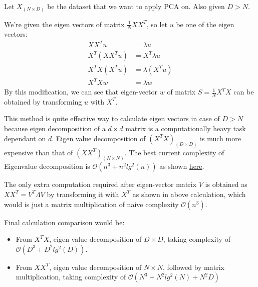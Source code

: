 \documentclass[a4paper,11pt]{article}
\begin{document}
\begin{mlsolution}

Let $X_{(N\times D)}$ be the dataset that we want to apply PCA on. Also given $D > N$.

We're given the eigen vectors of matrix $\frac{1}{N}XX^T$, so let $u$ be one of the eigen vectors:
\begin{align*}
    XX^T u &= \lambda u \\
    X^T (XX^T u) &= X^T \lambda u \\
    X^TX (X^T u) &= \lambda (X^T u) \\
    X^TX w &= \lambda w
\end{align*}
By this modification, we can see that eigen-vector $w$ of matrix $S = \frac{1}{N}X^TX$ can be obtained by transforming $u$ with $X^T$.

This method is quite effective way to calculate eigen vectors in case of $D > N$ because eigen decomposition of a $d \times d$ matrix is a computationally heavy task dependant on $d$.
Eigen value decomposition of $(X^TX)_{(D\times D)}$ is much more expensive than that of $(XX^T)_{(N\times N)}$. The best current complexity of Eigenvalue decomposition is $\mathcal{O}(n^3 + n^2 lg^2(n))$ as shown \href{https://cstheory.stackexchange.com/a/2810}{here}.

The only extra computation required after eigen-vector matrix $V$ is obtained as $XX^T = V^T \Lambda V$ by transforming it with $X^T$ as shown in above calculation, which would is just a matrix multiplication of naive complexity $\mathcal{O}(n^3)$.

Final calculation comparison would be:
\begin{itemize}[itemsep=2pt]
    \item From $X^TX$, eigen value decomposition of $D\times D$, taking complexity of $\mathcal{O}(D^3 + D^2 lg^2(D))$.
    \item From $XX^T$, eigen value decomposition of $N \times N$, followed by matrix multiplication, taking complexity of $\mathcal{O}(N^3 + N^2 lg^2(N) + N^2D)$
\end{itemize}

\end{mlsolution}
\end{document}
